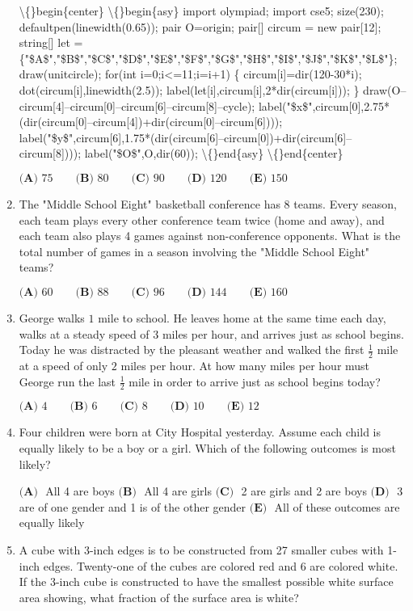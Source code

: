 \documentclass{article}
\begin{document}
\begin{enumerate}[label=\arabic*., itemsep=0.5em]
\textbackslash\{\}begin\{center\}
\textbackslash\{\}begin\{asy\}
import olympiad;
import cse5;
size(230);
defaultpen(linewidth(0.65));
pair O=origin;
pair[] circum = new pair[12];
string[] let = \{"\$A\$","\$B\$","\$C\$","\$D\$","\$E\$","\$F\$","\$G\$","\$H\$","\$I\$","\$J\$","\$K\$","\$L\$"\};
draw(unitcircle);
for(int i=0;i<=11;i=i+1)
\{
circum[i]=dir(120-30*i);
dot(circum[i],linewidth(2.5));
label(let[i],circum[i],2*dir(circum[i]));
\}
draw(O--circum[4]--circum[0]--circum[6]--circum[8]--cycle);
label("\$x\$",circum[0],2.75*(dir(circum[0]--circum[4])+dir(circum[0]--circum[6])));
label("\$y\$",circum[6],1.75*(dir(circum[6]--circum[0])+dir(circum[6]--circum[8])));
label("\$O\$",O,dir(60));
\textbackslash\{\}end\{asy\}
\textbackslash\{\}end\{center\}


\( \textbf{(A) }75\qquad\textbf{(B) }80\qquad\textbf{(C) }90\qquad\textbf{(D) }120\qquad\textbf{(E) }150 \)\par \vspace{0.5em}\item The "Middle School Eight" basketball conference has 8 teams. Every season, each team plays every other conference team twice (home and away), and each team also plays 4 games against non-conference opponents. What is the total number of games in a season involving the "Middle School Eight" teams?

\( \textbf{(A) }60\qquad\textbf{(B) }88\qquad\textbf{(C) }96\qquad\textbf{(D) }144\qquad\textbf{(E) }160 \)\par \vspace{0.5em}\item George walks \(1\) mile to school. He leaves home at the same time each day, walks at a steady speed of \(3\) miles per hour, and arrives just as school begins. Today he was distracted by the pleasant weather and walked the first \(\frac{1}{2}\) mile at a speed of only \(2\) miles per hour. At how many miles per hour must George run the last \(\frac{1}{2}\) mile in order to arrive just as school begins today?

\( \textbf{(A) }4\qquad\textbf{(B) }6\qquad\textbf{(C) }8\qquad\textbf{(D) }10\qquad\textbf{(E) }12 \)\par \vspace{0.5em}\item Four children were born at City Hospital yesterday. Assume each child is equally likely to be a boy or a girl. Which of the following outcomes is most likely?

\(\textbf{(A) } \) All 4 are boys   \(\textbf{(B) } \) All 4 are girls    \(\textbf{(C) } \) 2 are girls and 2 are boys
\(\textbf{(D) } \) 3 are of one gender and 1 is of the other gender     \(\textbf{(E) } \) All of these outcomes are equally likely\par \vspace{0.5em}\item A cube with 3-inch edges is to be constructed from 27 smaller cubes with 1-inch edges. Twenty-one of the cubes are colored red and 6 are colored white. If the 3-inch cube is constructed to have the smallest possible white surface area showing, what fraction of the surface area is white?


\end{enumerate}
\end{document}
